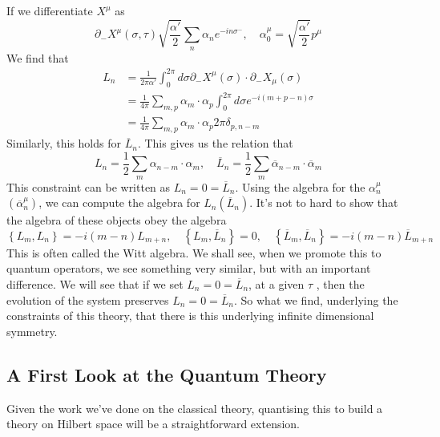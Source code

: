 \documentclass[11pt, oneside]{article}   	%
\theoremstyle{slanted}
\begin{document}
If we differentiate $ X ^ \mu $ as 
\[
\partial  _ - X ^ \mu \left( \sigma , \tau  \right)    
\sqrt{ \frac{ \alpha  ' }{ 2 }  }  \sum _{ n } \alpha _ n e ^{  - i n \sigma ^{  -}  } , \quad \alpha _ 0 ^{ \mu }  = \sqrt{ \frac{ \alpha '  }{ 2 } }  p ^ \mu 
\] We find 
that 
\begin{align*}
L_ n  &=  \frac{1}{2 \pi \alpha  ' } \int _ 0 ^{ 2 \pi } 
d \sigma \partial  _ - X ^ \mu \left( \sigma  \right)  \cdot  \partial  _  - 
X _ \mu \left( \sigma  \right)  \\ 
&=  \frac{1}{4 \pi } \sum _{ m , p } \alpha _ m \cdot  \alpha _ p \int 
_ 0 ^{ 2 \pi } d \sigma e ^{  - i \left( m + p - n  \right)  \sigma } \\
&=  \frac{1}{ 4 \pi } \sum _{ m , p } \alpha_ m \cdot  \alpha _ p 
2 \pi \delta _{ p , n  -m } 
\end{align*}
Similarly, this 
holds for $ \overline{ L } _ n $. 
This gives us the 
relation that 
\[
L _ n  = \frac{1}{2 } \sum _ m \alpha _{ n  - m } \cdot   \alpha _ m , 
\quad \overline{ L } _ n  = \frac{1}{2 } \sum _ m \overline{ \alpha } _{ n - m } \cdot  
\overline{ \alpha } _m 
\]  This constraint can be written 
as $ L _ n  = 0  = \overline{ L } _ n $. 
Using the algebra for the $ \alpha _ n ^ \mu $ $ \left( \overline{ \alpha } _ n ^ \mu  \right)  $, we can compute the algebra for $ L _ n \left( \overline{ L } _ n  \right)  $. 
It's 
not to hard to show that the algebra 
of these objects obey 
the algebra 
\[
\left\{  L _ m , L _ n  \right\}   = - i 
\left( m - n  \right)  L _{ m + n }, \quad 
\left\{  L _ m , \overline{ L } _ n  \right\}   = 0 , 
\quad \left\{  \overline{ L } _ m , \overline{ L } _ n  \right\}   = - i \left( m - n  \right)  \overline{ L } _{ m + n }
\] 
This is often called the Witt algebra. 
We shall see, when we promote this 
to quantum operators, 
we see something very similar, but with an important difference. 
We will see that if we set $ L _ n  = 0  = \overline{ L } _n $, 
at a given  $ \tau $ , then 
the evolution of the system 
preserves $ L _ n   = 0  = \overline{ L } _ n $. 
So what we find, underlying the constraints of 
this theory, that there is this underlying 
infinite dimensional symmetry. 

\subsection{A First Look at the Quantum Theory}
Given the work we've done
on the classical theory, quantising 
this to build a theory on Hilbert space will be a straightforward extension. 
\end{document}
